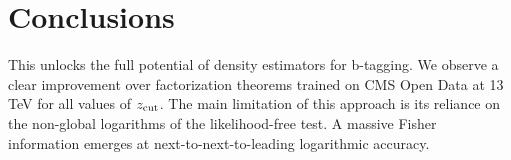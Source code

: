 \section{Conclusions}\label{sec:conclusions}

This unlocks the full potential of density estimators for b-tagging. We
observe a clear improvement over factorization theorems trained on CMS
Open Data at 13 TeV for all values of $z_{\rm cut}$. The main limitation
of this approach is its reliance on the non-global logarithms of the
likelihood-free test. A massive Fisher information emerges at
next-to-next-to-leading logarithmic accuracy.

